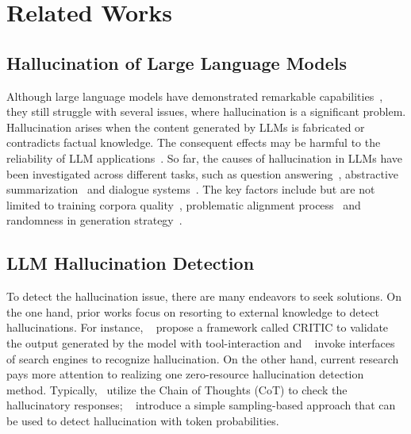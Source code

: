 \section{Related Works}
\label{related_works}

\subsection{Hallucination of Large Language Models}
Although large language models have demonstrated remarkable capabilities~\citep{liu2023summary,srivastava2022beyond}, they still struggle with several issues, where hallucination is a significant problem. 
Hallucination arises when the content generated by LLMs is fabricated or contradicts factual knowledge. 
The consequent effects may be harmful to the reliability of LLM applications~\citep{zhang2023siren,pan2023risk}.
So far, the causes of hallucination in LLMs have been investigated across different tasks, such as question answering~\citep{zheng2023does}, abstractive summarization~\citep{cao2021hallucinated} and dialogue systems~\citep{das2023diving}. The key factors include but are not limited to training corpora quality~\citep{mckenna2023sources,dziri2022origin}, problematic alignment process~\citep{radhakrishnan2023question,zhang2023siren} and randomness in generation strategy~\citep{lee2022factuality,dziri2021neural}.

\subsection{LLM Hallucination Detection}
To detect the hallucination issue, there are many endeavors to seek solutions. 
On the one hand, prior works focus on resorting to external knowledge to detect hallucinations.
For instance, ~\citet{gou2023critic} propose a framework called CRITIC to validate the output generated by the model with tool-interaction and ~\citet{chern2023factool} invoke interfaces of search engines to recognize hallucination.
On the other hand, current research pays more attention to realizing one zero-resource hallucination detection method. 
Typically,~\citet{xue2023rcot} utilize the Chain of Thoughts (CoT) to check the hallucinatory responses; ~\citet{selfcheckgpt} introduce a simple sampling-based approach that can be used to detect hallucination with token probabilities.

